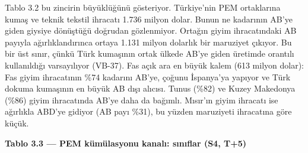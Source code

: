 Tablo 3.2 bu zincirin büyüklüğünü gösteriyor. Türkiye'nin PEM ortaklarına kumaş ve teknik tekstil ihracatı 1.736 milyon dolar. Bunun ne kadarının AB'ye giden giysiye dönüştüğü doğrudan gözlenmiyor. Ortağın giyim ihracatındaki AB payıyla ağırlıklandırınca ortaya 1.131 milyon dolarlık bir maruziyet çıkıyor. Bu bir üst sınır, çünkü Türk kumaşının ortak ülkede AB'ye giden üretimde orantılı kullanıldığı varsayılıyor (VB-37). Fas açık ara en büyük kalem (613 milyon dolar): Fas giyim ihracatının \%74 kadarını AB'ye, çoğunu İspanya'ya yapıyor ve Türk dokuma kumaşının en büyük AB dışı alıcısı. Tunus (\%82) ve Kuzey Makedonya (\%86) giyim ihracatında AB'ye daha da bağımlı. Mısır'ın giyim ihracatı ise ağırlıkla ABD'ye gidiyor (AB payı \%31), bu yüzden maruziyeti ihracatına göre küçük.


\textbf{Tablo 3.3 --- PEM kümülasyonu kanalı: sınıflar (S4, T+5)}

\nopagebreak[4]

\begingroup\gbtablo\footnotesize

